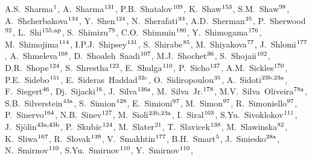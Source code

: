 \begin{flushleft}
A.S.~Sharma$^\textrm{\scriptsize 1}$,    
A.~Sharma$^\textrm{\scriptsize 131}$,    
P.B.~Shatalov$^\textrm{\scriptsize 109}$,    
K.~Shaw$^\textrm{\scriptsize 153}$,    
S.M.~Shaw$^\textrm{\scriptsize 98}$,    
A.~Shcherbakova$^\textrm{\scriptsize 134}$,    
Y.~Shen$^\textrm{\scriptsize 124}$,    
N.~Sherafati$^\textrm{\scriptsize 33}$,    
A.D.~Sherman$^\textrm{\scriptsize 25}$,    
P.~Sherwood$^\textrm{\scriptsize 92}$,    
L.~Shi$^\textrm{\scriptsize 155,ap}$,    
S.~Shimizu$^\textrm{\scriptsize 79}$,    
C.O.~Shimmin$^\textrm{\scriptsize 180}$,    
Y.~Shimogama$^\textrm{\scriptsize 176}$,    
M.~Shimojima$^\textrm{\scriptsize 114}$,    
I.P.J.~Shipsey$^\textrm{\scriptsize 131}$,    
S.~Shirabe$^\textrm{\scriptsize 85}$,    
M.~Shiyakova$^\textrm{\scriptsize 77}$,    
J.~Shlomi$^\textrm{\scriptsize 177}$,    
A.~Shmeleva$^\textrm{\scriptsize 108}$,    
D.~Shoaleh~Saadi$^\textrm{\scriptsize 107}$,    
M.J.~Shochet$^\textrm{\scriptsize 36}$,    
S.~Shojaii$^\textrm{\scriptsize 102}$,    
D.R.~Shope$^\textrm{\scriptsize 124}$,    
S.~Shrestha$^\textrm{\scriptsize 122}$,    
E.~Shulga$^\textrm{\scriptsize 110}$,    
P.~Sicho$^\textrm{\scriptsize 137}$,    
A.M.~Sickles$^\textrm{\scriptsize 170}$,    
P.E.~Sidebo$^\textrm{\scriptsize 151}$,    
E.~Sideras~Haddad$^\textrm{\scriptsize 32c}$,    
O.~Sidiropoulou$^\textrm{\scriptsize 35}$,    
A.~Sidoti$^\textrm{\scriptsize 23b,23a}$,    
F.~Siegert$^\textrm{\scriptsize 46}$,    
Dj.~Sijacki$^\textrm{\scriptsize 16}$,    
J.~Silva$^\textrm{\scriptsize 136a}$,    
M.~Silva~Jr.$^\textrm{\scriptsize 178}$,    
M.V.~Silva~Oliveira$^\textrm{\scriptsize 78a}$,    
S.B.~Silverstein$^\textrm{\scriptsize 43a}$,    
S.~Simion$^\textrm{\scriptsize 128}$,    
E.~Simioni$^\textrm{\scriptsize 97}$,    
M.~Simon$^\textrm{\scriptsize 97}$,    
R.~Simoniello$^\textrm{\scriptsize 97}$,    
P.~Sinervo$^\textrm{\scriptsize 164}$,    
N.B.~Sinev$^\textrm{\scriptsize 127}$,    
M.~Sioli$^\textrm{\scriptsize 23b,23a}$,    
I.~Siral$^\textrm{\scriptsize 103}$,    
S.Yu.~Sivoklokov$^\textrm{\scriptsize 111}$,    
J.~Sj\"{o}lin$^\textrm{\scriptsize 43a,43b}$,    
P.~Skubic$^\textrm{\scriptsize 124}$,    
M.~Slater$^\textrm{\scriptsize 21}$,    
T.~Slavicek$^\textrm{\scriptsize 138}$,    
M.~Slawinska$^\textrm{\scriptsize 82}$,    
K.~Sliwa$^\textrm{\scriptsize 167}$,    
R.~Slovak$^\textrm{\scriptsize 139}$,    
V.~Smakhtin$^\textrm{\scriptsize 177}$,    
B.H.~Smart$^\textrm{\scriptsize 5}$,    
J.~Smiesko$^\textrm{\scriptsize 28a}$,    
N.~Smirnov$^\textrm{\scriptsize 110}$,    
S.Yu.~Smirnov$^\textrm{\scriptsize 110}$,    
Y.~Smirnov$^\textrm{\scriptsize 110}$,    

\end{flushleft}
